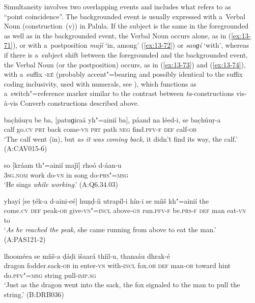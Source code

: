  Simultaneity involves two overlapping events and includes what
\citet[330]{givon2001b} refers to as ``point coincidence''. The backgrounded event
\citep[254--255]{thompsonetal2007} is usually expressed with a~Verbal Noun (construction~(v)) in
Palula. If the subject is the same in the foregrounded as well as in the backgrounded event, the
Verbal Noun occurs alone, as in (\ref{ex:13-71}), or with a~postposition \textit{maǰí} `in,
among' (\ref{ex:13-72}) or \textit{sanɡí} `with', whereas if there is a~subject shift between
the foregrounded and the backgrounded event, the Verbal Noun (or the postposition) occurs, as in
(\ref{ex:13-73}) and (\ref{ex:13-74}), with a~suffix \textsc{-eé} (probably
accent"=bearing and possibly identical to the suffix coding inclusivity, used with numerals, see ), which functions as a~switch"=reference marker similar to the contrast between
\textit{ta}-constructions vis-à-vis Converb constructions described above.

\begin{exe}
\ex
\label{ex:13-71}
\gll bac̣húuṛu be ba, [patuɡiraá yh"=ainií ba], páand na léed-i, se bac̣húuṛ-a \\
calf go.\textsc{cv} \textsc{prt } back come-\textsc{vn }  \textsc{prt} path \textsc{neg} find.\textsc{pfv-f} \textsc{def} calf-\textsc{ob}  \\
\glt `The calf went (in), but \textit{as it was coming back}, it didn't find its way, the calf.' (A:CAV015-6)

\ex
\label{ex:13-72}
\gll so [kráam th"=ainií maǰí] rhoó d-áan-u  \\
\textsc{3sg.nom} work do-\textsc{vn} in song do-\textsc{prs"=msg}  \\
\glt `He sings \textit{while working}.' (A:Q6.34.03)

\ex
\label{ex:13-73}
\gll yhayí [se ṭék-a d-aini-eé] huṇḍ-íi utrapíl-i hín-i se míiš kh"=ainií the \\
come.\textsc{cv} \textsc{def} peak-\textsc{ob} give-\textsc{vn"=incl} above-\textsc{gn} run.\textsc{pfv-f}  be.\textsc{prs-f } \textsc{def} man eat-\textsc{vn} to  \\
\glt `\textit{As he reached the peak}, she came running from above to eat the man.' (A:PAS121-2)

\ex
\label{ex:13-74}
 lhooméea se míiš-a ḍáḍi išaará thíil-u, thanaáu dhrak-é \\
dragon fodder.sack-\textsc{ob} in enter-\textsc{vn} with-\textsc{incl}  fox.\textsc{ob} \textsc{def} man-\textsc{ob} toward hint do.\textsc{pfv"=msg} string pull-\textsc{imp.sg}  \\
\glt `Just as the dragon went into the sack, the fox signaled to the man to pull the string.' (B:DRB036)
\end{exe}

